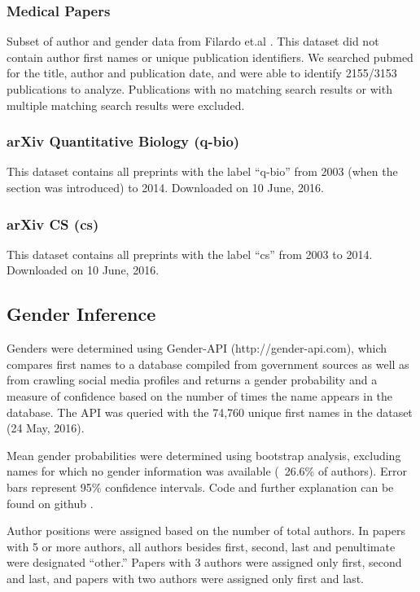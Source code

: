 \documentclass[10pt,letterpaper]{article}
\begin{document}
\begin{flushleft}
\subsubsection*{Medical Papers}
Subset of author and gender data from Filardo et.al \cite{Filardo2016}. This dataset did not contain author first names or unique publication identifiers. We searched pubmed for the title, author and publication date, and were able to identify 2155/3153 publications to analyze. Publications with no matching search results or with multiple matching search results were excluded.

\subsubsection*{arXiv Quantitative Biology (q-bio)}
This dataset \cite{Bonham2016a} contains all preprints with the label “q-bio” from 2003 (when the section was introduced) to 2014. Downloaded on 10 June, 2016.

\subsubsection*{arXiv CS (cs)}
This dataset \cite{Bonham2016a} contains all preprints with the label “cs” from 2003 to 2014. Downloaded on 10 June, 2016.

\subsection*{Gender Inference}
Genders were determined using Gender-API (http://gender-api.com), which compares first names to a database compiled from government sources as well as from crawling social media profiles and returns a gender probability and a measure of confidence based on the number of times the name appears in the database. The API was queried with the 74,760 unique first names in the dataset (24 May, 2016).

Mean gender probabilities were determined using bootstrap analysis, excluding names for which no gender information was available (~26.6\% of authors). Error bars represent 95\% confidence intervals. Code and further explanation can be found on github \cite{Bonham2016b}.

Author positions were assigned based on the number of total authors. In papers with 5 or more authors, all authors besides first, second, last and penultimate were designated “other.” Papers with 3 authors were assigned only first, second and last, and papers with two authors were assigned only first and last.


\end{flushleft}
\end{document}

